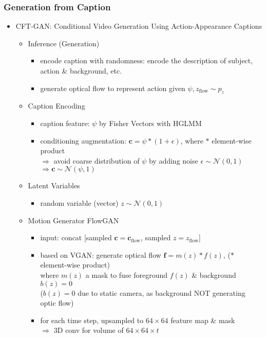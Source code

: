 \subsubsection{Generation from Caption}
\begin{itemize}
\item CFT-GAN: Conditional Video Generation Using Action-Appearance Captions
	\begin{itemize}
	\item Inference (Generation)
		\begin{itemize}
		\item encode caption with randomness: encode the description of subject, action \& background, etc.
		\item generate optical flow to represent action given $\psi, z_\text{flow}\sim p_z$
		\end{itemize}
	\item Caption Encoding
		\begin{itemize}
		\item caption feature: $\psi$ by Fisher Vectors with HGLMM
		\item conditioning augmentation: $\mathbf c = \psi*(1+\epsilon)$, where $*$ element-wise product \\
		$\Rightarrow$ avoid coarse distribution of $\psi$ by adding noise $\epsilon\sim\mathcal N(0,1)$ \\
		$\Rightarrow \mathbf c \sim \mathcal N(\psi, 1)$
		\end{itemize}
	\item Latent Variables
		\begin{itemize}
		\item random variable (vector) $z\sim\mathcal N(0,1)$
		\end{itemize}
	\item Motion Generator FlowGAN
		\begin{itemize}
		\item input: concat [sampled $\mathbf c=\mathbf c_\text{flow}$, sampled $z=z_\text{flow}$]
		\item based on VGAN: generate optical flow $\mathbf f = m(z)*f(z)$, ($*$ element-wise product)\\ 
		where $m(z)$ a mask to fuse foreground $f(z)$ \& background $b(z)=0$ \\
		($b(z)=0$ due to static camera, as background NOT generating optic flow)
		\item for each time step, upsampled to $64\times 64$ feature map \& mask \\
		$\Rightarrow$ 3D conv for volume of $64\times64\times t$

\end{itemize}
\end{itemize}
\end{itemize}

